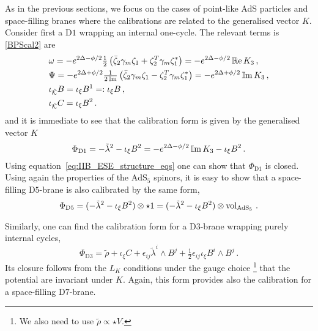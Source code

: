 \documentclass[debug]{phd}
\begin{document}
As in the previous sections, we focus on the cases of point-like AdS particles and space-filling branes where the calibrations are related to the generalised vector $K$. 
Consider first a D$1$ wrapping an internal one-cycle. 
The relevant terms is \eqref{BPScal2} are 
%
	\begin{equation} 
		\begin{aligned}
			&\omega =- e^{2\Delta-\phi/2} \tfrac{1}{2} \left(\bar{\zeta}_2 \gamma_m \zeta_1 + \zeta_2^T\gamma_m \zeta_1^* \right) = - e^{2\Delta-\phi/2} \operatorname{\mathbb{R}e} K_3\, , \\
			&\Psi =- e^{2\Delta+\phi/2}\tfrac{1}{2\operatorname{\mathbb{I}m}} \left(\bar{\zeta}_2 \gamma_m \zeta_1 - \zeta_2^T\gamma_m \zeta_1^* \right) = - e^{2\Delta+\phi/2} \operatorname{\mathbb{I}m} K_3\, , \\
			&\iota_{\hat{\mathcal{K}}} B = \iota_\xi B^1 =: \iota_\xi B\, , \\
			&\iota_{\hat{\mathcal{K}}} C = \iota_\xi B^2\, .
		\end{aligned}
	\end{equation} 
%
and it is immediate to see that the calibration form is given by the generalised vector $K$
%
	\begin{equation} 
		\Phi_{\mathrm{D}1} = -\tilde{\lambda}^2 -\iota_\xi B^2 = -e^{2\Delta-\phi/2} \operatorname{\mathbb{I}m} K_3 -\iota_\xi B^2\, .
	\end{equation} 
Using equation~\eqref{eq:IIB_ESE_structure_eqs} one can show that $\Phi_{\mathrm{D}1}$ is closed. 
Using again the properties of the $\mathrm{AdS}_5$ spinors, it is easy to show that a space-filling D$5$-brane is also calibrated by the same form,
%
	\begin{equation} 
		\Phi_{\mathrm{D}5} = ( -\tilde{\lambda}^2 -\iota_\xi B^2) \otimes \star 1 =( -\tilde{\lambda}^2 -\iota_\xi B^2) \otimes \operatorname{vol}_{\mathrm{AdS}_5} \, .
	\end{equation} 
%

Similarly, one can find the calibration form for a D$3$-brane wrapping purely internal cycles,
%
	\begin{equation} 
	\label{D3cal}
		\Phi_{\mathrm{D}3}= \tilde{\rho} +\iota_\xi C +\epsilon_{ij}\tilde{\lambda}^i \wedge B^j + \tfrac{1}{2}\epsilon_{ij}\iota_\xi B^i \wedge B^j\, .
	\end{equation} 
%
Its closure follows from the $L_K$ conditions under the gauge choice%
		\footnote{%
		We also need to use $\tilde{\rho} \propto \star V$.%
		} that the potential are invariant under $K$.
Again, this form provides also the calibration for a space-filling D$7$-brane.
\end{document}
